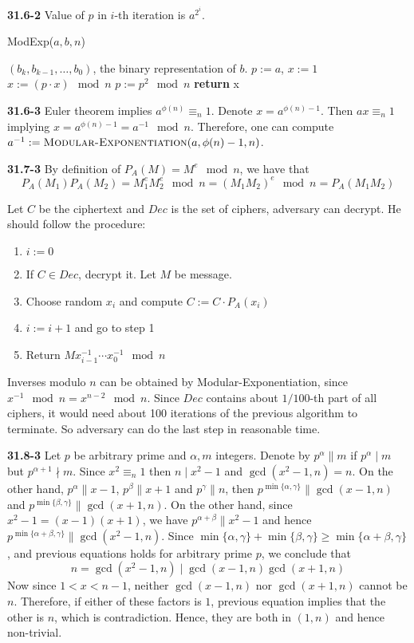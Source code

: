\documentclass[12pt]{amsart}
\numberwithin{equation}{section}
\renewcommand{\(}{\left(}
\renewcommand{\)}{\right)}
\renewcommand{\[}{\left[}
\renewcommand{\]}{\right]}
\begin{document}
\newpage


\noindent \textbf{31.6-2} Value of $p$ in $i$-th iteration is $a^{2^i}$.

\begin{algorithm}[H]
\caption{ModExp($a,b,n$)}
\begin{algorithmic}[1]
\REQUIRE $(b_k,b_{k-1},\ldots,b_0)$, the binary representation of $b$.
\STATE $p:=a$, $x:=1$
\STATE $x:=(p\cdot x) \mod n$
\ENDIF
\STATE $p:=p^2 \mod n$
\ENDFOR
\STATE \textbf{return} x
\end{algorithmic}
\end{algorithm}

\bigskip

\noindent \textbf{31.6-3} Euler theorem implies $a^{\phi(n)}\equiv_n1$. Denote $x=a^{\phi(n)-1}$. Then $ax\equiv_n1$ implying $x=a^{\phi(n)-1}=a^{-1} \mod n$. Therefore, one can compute $a^{-1}:=\textsc{Modular-Exponentiation}(a, \phi(n)-1, n)$.

\bigskip

\noindent \textbf{31.7-3} By definition of $P_A(M)=M^e \mod n$, we have that
$$
P_A(M_1)P_A(M_2)=M_1^eM_2^e \mod n = (M_1M_2)^e \mod n = P_A(M_1M_2)
$$

Let $C$ be the ciphertext and $Dec$ is the set of ciphers, adversary can decrypt. He should follow the procedure:
\begin{enumerate}
  \item $i:=0$
  \item If $C \in Dec$, decrypt it. Let $M$ be message.
  \item Choose random $x_i$ and compute $C:=C\cdot P_A(x_i)$
  \item $i:=i+1$ and go to step 1
  \item Return $Mx_{i-1}^{-1}\cdots x_0^{-1} \mod n$
\end{enumerate}
Inverses modulo $n$ can be obtained by Modular-Exponentiation, since $x^{-1} \mod n = x^{n-2} \mod n$. Since $Dec$ contains about $1/100$-th part of all ciphers, it would need about 100 iterations of the previous algorithm to terminate. So adversary can do the last step in reasonable time.

\bigskip

\noindent \textbf{31.8-3} Let $p$ be arbitrary prime and $\alpha,m$ integers. Denote by $p^\alpha \parallel m$ if $p^\alpha \mid m$ but $p^{\alpha+1} \nmid m$. Since $x^2 \equiv_n1$ then $n\mid x^2-1$ and $\gcd(x^2-1,n)=n$. On the other hand, $p^\alpha \parallel x-1$, $p^\beta \parallel x+1$ and $p^\gamma \parallel n$, then $p^{\min\{\alpha,\gamma\}}\parallel \gcd(x-1,n)$ and $p^{\min\{\beta,\gamma\}}\parallel \gcd(x+1,n)$. On the other hand, since $x^2-1=(x-1)(x+1)$, we have $p^{\alpha+\beta}\parallel x^2-1$ and hence $p^{\min\{\alpha+\beta,\gamma\}}\parallel \gcd(x^2-1,n)$. Since $\min\{\alpha,\gamma\}+\min\{\beta,\gamma\}\geq \min\{\alpha+\beta,\gamma\}$, and previous equations holds for arbitrary prime $p$, we conclude that 
$$
n=\gcd(x^2-1,n) \mid \gcd(x-1,n)\gcd(x+1,n) 
$$
Now since $1<x<n-1$, neither $\gcd(x-1,n)$ nor $\gcd(x+1,n)$ cannot be $n$. Therefore, if either of these factors is $1$, previous equation implies that the other is $n$, which is contradiction. Hence, they are both in $(1,n)$ and hence non-trivial. 
\end{document}
